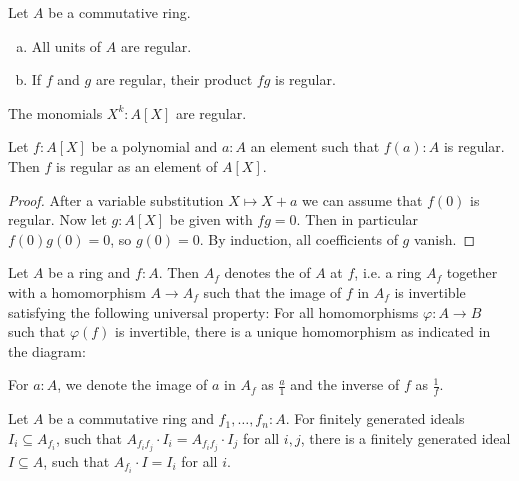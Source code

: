 \begin{lemma}%
  \label{units-products-regular}
  Let $A$ be a commutative ring.
  \begin{enumerate}[(a)]
  \item All units of $A$ are regular.
  \item If $f$ and $g$ are regular, their product $fg$ is regular.
  \end{enumerate}
\end{lemma}

\begin{example}
  The monomials $X^k:A[X]$ are regular.
\end{example}

\begin{lemma}%
  \label{polynomial-with-regular-value-is-regular}
  Let $f : A[X]$ be a polynomial
  and $a : A$ an element
  such that $f(a) : A$ is regular.
  Then $f$ is regular as an element of $A[X]$.
\end{lemma}

\begin{proof}
  After a variable substitution $X \mapsto X + a$
  we can assume that $f(0)$ is regular.
  Now let $g : A[X]$ be given with $fg = 0$.
  Then in particular $f(0) g(0) = 0$,
  so $g(0) = 0$.
  By induction,
  all coefficients of $g$ vanish.
\end{proof}

\begin{definition}
  Let $A$ be a ring and $f:A$.
  Then $A_{f}$ denotes the  of $A$ at $f$,
  i.e. a ring $A_f$ together with a homomorphism $A\to A_f$ such that the image of \(f\) in \(A_f\) is invertible satisfying the following universal property: For all homomorphisms $\varphi:A\to B$ such that
  $\varphi(f)$ is invertible, there is a unique homomorphism as indicated in the diagram:
  \begin{center}
  \end{center}
  For $a:A$, we denote the image of $a$ in $A_f$ as $\frac{a}{1}$ and the inverse of $f$ as $\frac{1}{f}$.
\end{definition}

\begin{lemma}%
  \label{fg-ideal-local-global}
  Let $A$ be a commutative ring and $f_1,\dots,f_n:A$.
  For finitely generated ideals $I_i\subseteq A_{f_i}$,
  such that $A_{f_if_j}\cdot I_i=A_{f_if_j}\cdot I_j$ for all $i,j$,
  there is a finitely generated ideal $I\subseteq A$,
  such that $A_{f_i}\cdot I=I_i$ for all $i$.
\end{lemma}

